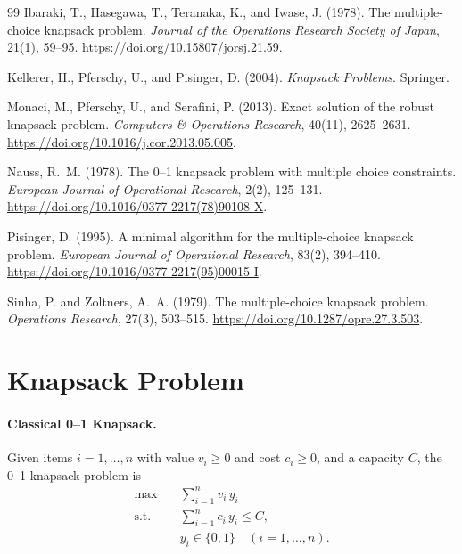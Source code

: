 \documentclass[11pt, a4paper]{article}
\theoremstyle{plain}
\theoremstyle{definition}
\theoremstyle{remark}
\begin{document}
\begin{thebibliography}{99}
Ibaraki, T., Hasegawa, T., Teranaka, K., and Iwase, J. (1978).
\newblock The multiple-choice knapsack problem.
\newblock \emph{Journal of the Operations Research Society of Japan}, 21(1), 59--95.
\newblock \url{https://doi.org/10.15807/jorsj.21.59}.

Kellerer, H., Pferschy, U., and Pisinger, D. (2004).
\newblock \emph{Knapsack Problems}.
\newblock Springer.

Monaci, M., Pferschy, U., and Serafini, P. (2013).
\newblock Exact solution of the robust knapsack problem.
\newblock \emph{Computers \& Operations Research}, 40(11), 2625--2631.
\newblock \url{https://doi.org/10.1016/j.cor.2013.05.005}.

Nauss, R.~M. (1978).
\newblock The 0--1 knapsack problem with multiple choice constraints.
\newblock \emph{European Journal of Operational Research}, 2(2), 125--131.
\newblock \url{https://doi.org/10.1016/0377-2217(78)90108-X}.

Pisinger, D. (1995).
\newblock A minimal algorithm for the multiple-choice knapsack problem.
\newblock \emph{European Journal of Operational Research}, 83(2), 394--410.
\newblock \url{https://doi.org/10.1016/0377-2217(95)00015-I}.

Sinha, P. and Zoltners, A.~A. (1979).
\newblock The multiple-choice knapsack problem.
\newblock \emph{Operations Research}, 27(3), 503--515.
\newblock \url{https://doi.org/10.1287/opre.27.3.503}.

\end{thebibliography}

\appendix
\section{Knapsack Problem}\label{app:background}

\paragraph{Classical 0--1 Knapsack.}
Given items $i=1,\dots,n$ with value $v_i\ge 0$ and cost $c_i\ge 0$, and a capacity $C$, the 0--1 knapsack problem is
\begin{align}
\max \quad & \sum_{i=1}^n v_i\,y_i \\
\text{s.t.}\quad & \sum_{i=1}^n c_i\,y_i \le C, \\
& y_i \in\{0,1\}\quad (i=1,\dots,n).
\end{align}
\end{document}

